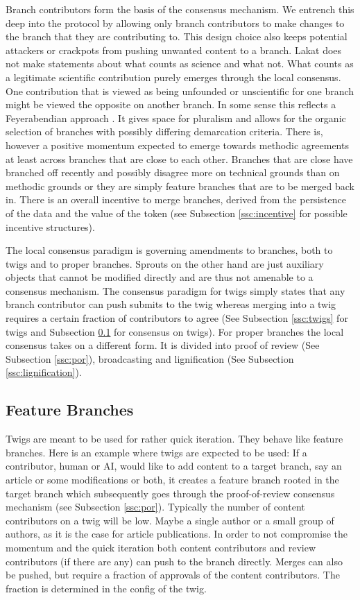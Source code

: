 \documentclass[14pt]{article}
\begin{document}
Branch contributors form the basis of the consensus mechanism. We entrench this deep into the protocol by allowing only branch contributors to make changes to the branch that they are contributing to. This design choice also keeps potential attackers or crackpots from pushing unwanted content to a branch. Lakat does not make statements about what counts as science and what not. What counts as a legitimate scientific contribution purely emerges through the local consensus. One contribution that is viewed as being unfounded or unscientific for one branch might be viewed the opposite on another branch. In some sense this reflects a Feyerabendian approach \cite{}. It gives space for pluralism and allows for the organic selection of branches with possibly differing demarcation criteria. There is, however a positive momentum expected to emerge towards methodic agreements at least across branches that are close to each other. Branches that are close have branched off recently and possibly disagree more on technical grounds than on methodic grounds or they are simply feature branches that are to be merged back in. There is an overall incentive to merge branches, derived from the persistence of the data and the value of the token (see Subsection \ref{ssc:incentive} for possible incentive structures). 

The local consensus paradigm is governing amendments to branches, both to twigs and to proper branches. Sprouts on the other hand are just auxiliary objects that cannot be modified directly and are thus not amenable to a consensus mechanism. The consensus paradigm for twigs simply states that any branch contributor can push submits to the twig whereas merging into a twig requires a certain fraction of contributors to agree (See Subsection \ref{ssc:twigs} for twigs and Subsection \ref{ssc:twiglocalconsensus} for consensus on twigs). For proper branches the local consensus takes on a different form. It is divided into proof of review (See Subsection \ref{ssc:por}), broadcasting and lignification (See Subsection \ref{ssc:lignification}).

\subsection{Feature Branches}\label{ssc:twiglocalconsensus}

Twigs are meant to be used for rather quick iteration. They behave like feature branches. Here is an example where twigs are expected to be used: If a contributor, human or AI, would like to add content to a target branch, say an article or some modifications or both, it creates a feature branch rooted in the target branch which subsequently goes through the proof-of-review consensus mechanism (see Subsection \ref{ssc:por}). Typically the number of content contributors on a twig will be low. Maybe a single author or a small group of authors, as it is the case for article publications. In order to not compromise the momentum and the quick iteration both content contributors and review contributors (if there are any) can push to the branch directly. Merges can also be pushed, but require a fraction of approvals of the content contributors. The fraction is determined in the config of the twig. 
\end{document}
